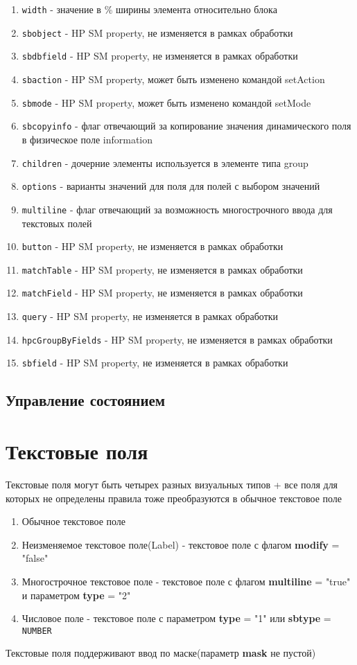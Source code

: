 \documentclass[../index.tex]{subfiles}
\begin{document}
\begin{enumerate}
    \item \verb|width| - значение в \% ширины элемента относительно блока
    \item \verb|sbobject| - HP SM property, не изменяется в рамках обработки
    \item \verb|sbdbfield| - HP SM property, не изменяется в рамках обработки
    \item \verb|sbaction| - HP SM property, может быть изменено командой setAction
    \item \verb|sbmode| - HP SM property, может быть изменено командой setMode
    \item \verb|sbcopyinfo| - флаг отвечающий за копирование значения динамического поля в физическое поле information 
    \item \verb|children| - дочерние элементы используется в элементе типа group
    \item \verb|options| - варианты значений для поля для полей с выбором значений
    \item \verb|multiline| - флаг отвечающий за возможность многострочного ввода для текстовых полей
    \item \verb|button| - HP SM property, не изменяется в рамках обработки
    \item \verb|matchTable| - HP SM property, не изменяется в рамках обработки
    \item \verb|matchField| - HP SM property, не изменяется в рамках обработки
    \item \verb|query| - HP SM property, не изменяется в рамках обработки
    \item \verb|hpcGroupByFields| - HP SM property, не изменяется в рамках обработки
    \item \verb|sbfield| - HP SM property, не изменяется в рамках обработки
\end{enumerate}

\subsection{Управление состоянием}

\section{Текстовые поля}
    Текстовые поля могут быть четырех разных визуальных типов + все поля для которых не определены правила тоже преобразуются в обычное текстовое поле
    \begin{enumerate}
        \item Обычное текстовое поле
        \item Неизменяемое текстовое поле(Label) - текстовое поле с флагом \textbf{modify} = "false"
        \item Многострочное текстовое поле - текстовое поле с флагом \textbf{multiline} = "true" и параметром \textbf{type} = "2"
        \item Числовое поле - текстовое поле с параметром \textbf{type} = "1" или \textbf{sbtype} = \verb|NUMBER|
    \end{enumerate}
    Текстовые поля поддерживают ввод по маске(параметр \textbf{mask} не пустой)
\end{document}
